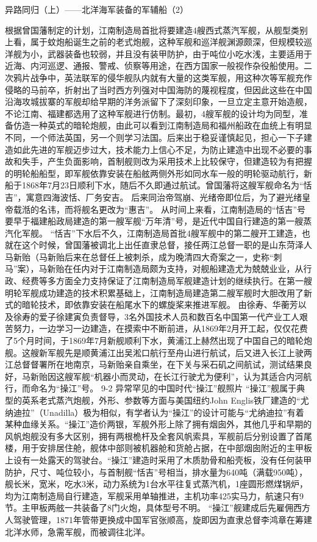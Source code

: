 \documentclass[12pt,UTF8]{ctexbook}
\begin{document}
异路同归（上）——北洋海军装备的军辅船（2）

根据曾国藩制定的计划，江南制造局首批将要建造4艘西式蒸汽军舰，从舰型类别上看，属于蚊炮船诞生之前的老式炮舰，这种军舰和巡洋舰渊源颇深，但规模较巡洋舰为小，武器装备也较弱，并且没有装甲防护，由于吨位小吃水浅，主要适用于近海、内河巡逻、通报、警戒、侦察等用途，在西方国家一般视作杂役船使用。二次鸦片战争中，英法联军的侵华舰队内就有大量的这类军舰，用这种次等军舰充作侵略的马前卒，折射出了当时西方列强对中国海防的蔑视程度，但因此这些在中国沿海攻城拔寨的军舰却给早期的洋务派留下了深刻印象，一旦立定主意开始造舰，不论江南、福建都选用了这种军舰进行仿制。最初，4艘军舰的设计均为同型，准备仿造一种英式的暗轮炮舰，由此可以看到江南制造局和福州船政在血统上有明显不同，一个师法英国，另一个则学习法国。后来出于稳妥谨慎起见，担心一下子建造如此先进的军舰迈步过大，技术能力上信心不足，为防止建造中出现不必要的事故和失手，产生负面影响，首制舰则改为采用技术上比较保守，但建造较为有把握的明轮船船型，即军舰依靠安装在船舷两侧外形如同水车一般的明轮驱动航行，新船于1868年7月23日顺利下水，随后不久即通过航试。曾国藩将这艘军舰命名为“恬吉”，寓意四海波恬、厂务安吉。 后来同治帝驾崩、光绪帝即位后，为了避光绪皇帝载湉的名讳，而将舰名更改为“惠吉”。 从时间上来看，江南制造局的“恬吉”号要早于福建船政局建造的第一艘军舰“万年清”号，是近代中国自行建造的第一艘蒸汽化军舰。
“恬吉”下水后不久，江南制造局首批4艘军舰中的第二艘开工建造，也就在这个时候，曾国藩被调北上出任直隶总督，接任两江总督一职的是山东菏泽人马新贻（马新贻后来在总督任上被刺杀，成为晚清四大奇案之一，史称“刺马”案），马新贻在任内对于江南制造局颇为支持，对舰船建造尤为兢兢业业，从行政、经费等多方面全力支持保证了江南制造局军舰建造计划的继续执行。在第一艘明轮军舰成功建造的技术积累基础上，江南制造局建造第二艘军舰时大胆改用了新式的暗轮技术，即依靠安装在船尾水下的螺旋桨来推进军舰。
由徐寿、华蘅芳以及徐寿的爱子徐建寅负责督导，3名外国技术人员和数百名中国第一代产业工人艰苦努力，一边学习一边建造，在摸索中不断前进，从1869年2月开工起，仅仅花费了5个月时间，于1869年7月新舰顺利下水，黄浦江上赫然出现了中国自己的暗轮炮舰。这艘新军舰先是顺黄浦江出吴淞口航行至舟山进行航试，后又进入长江上驶两江总督督署所在地南京，马新贻亲自乘坐，在下关与采石矶之间航试，测试结果良好，马新贻因这艘军舰“机器小而灵动，在长江行驶尤为便利”，认为其适合内河航行，而命名为“操江”号。
9-2 异常罕见的中国时代“操江”舰照片
“操江”舰属于典型的英系老式蒸汽炮舰，外形、参数等方面与美国纽约John Englis铁厂建造的“尤纳迪拉”（Unadilla）极为相似，有学者认为“操江”的设计可能与“尤纳迪拉”有着某种血缘关系。“操江”造价两银，军舰外形上除了拥有烟囱外，其他几乎和早期的风帆炮舰没有多大区别，拥有两根桅杆及全套风帆索具，军舰前后分别设置了首尾楼，用于安排居住舱，舰体中部则被机器舱和货舱占据，在中部烟囱附近的主甲板上设有一处露天的驾驶台。“操江”建造时采用了木质肋骨和船壳板，没有任何装甲防护，尺寸、吨位较小，与首制舰“恬吉”号相当，排水量为640吨（满载950吨），舰长米，宽米，吃水3米，动力系统为1台水平往复式蒸汽机，1座圆形燃煤锅炉，均为江南制造局自行建造，军舰采用单轴推进，主机功率425实马力，航速只有9节。主甲板两舷一共装备了8门火炮，具体型号不明。 “操江”舰建成后先雇佣西方人驾驶管理，1871年管带更换成中国军官张顺高，旋即因为直隶总督李鸿章在筹建北洋水师，急需军舰，而被调往北洋。
\end{document}
